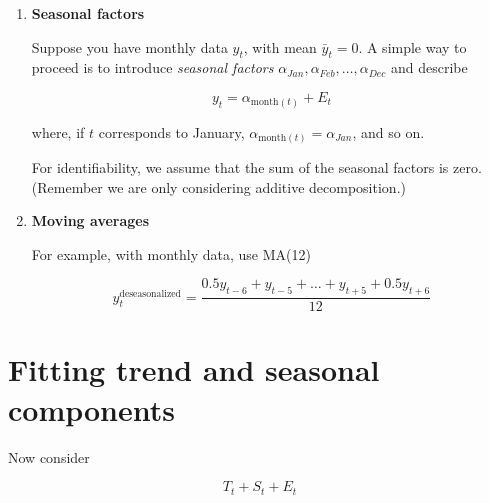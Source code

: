 \documentclass[dvipsnames,12pt]{book}
\begin{document}
                \begin{enumerate}
                    \item \textbf{Seasonal factors}

                        Suppose you have monthly data \( y_t \), with mean \( \bar{y}_t = 0 \). A simple way to proceed is to introduce \textit{seasonal factors}  \( \alpha_{Jan}, \alpha_{Feb}, \dots, \alpha_{Dec} \) and describe
                        
                        \begin{equation}
                            y_t = \alpha_{\text{month}(t)} + E_t
                        \end{equation}
                        
                        where, if \( t \) corresponds to January, \( \alpha_{\text{month}(t)} = \alpha_{Jan} \), and so on. 
                        
                        \noindent For identifiability, we assume that the sum of the seasonal factors is zero. (Remember we are only considering additive decomposition.)

                    \item \textbf{Moving averages}

                        For example, with monthly data, use MA(12)

                        \begin{equation}
                            y_t^{\text{deseasonalized}} = \frac{0.5 y_{t-6} + y_{t-5} + \dots + y_{t+5} + 0.5 y_{t+6}}{12}
                        \end{equation}
                \end{enumerate}

\newpage
                
        \section{Fitting trend and seasonal components}

            Now consider

                \begin{equation}
                    T_t + S_t + E_t
                \end{equation}
\end{document}
